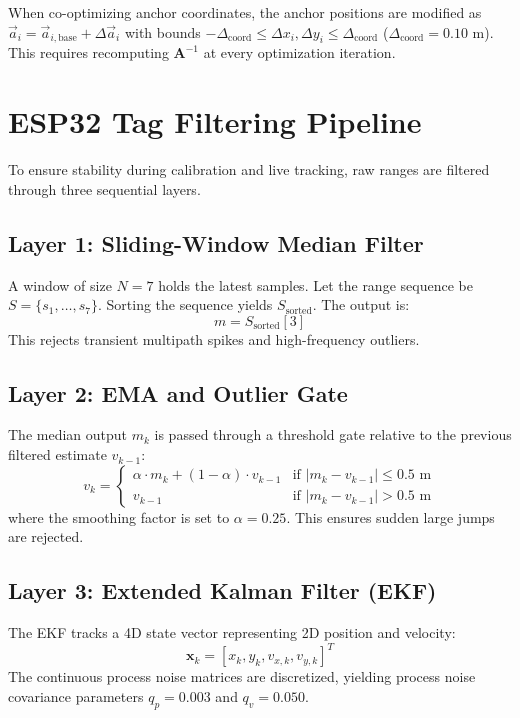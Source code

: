 \documentclass[11pt,a4paper]{article}
\begin{document}
When co-optimizing anchor coordinates, the anchor positions are modified as $\vec{a}_i = \vec{a}_{i,\text{base}} + \Delta\vec{a}_i$ with bounds $-\Delta_{\text{coord}} \le \Delta x_i, \Delta y_i \le \Delta_{\text{coord}}$ ($\Delta_{\text{coord}} = 0.10 \text{ m}$). This requires recomputing $\mathbf{A}^{-1}$ at every optimization iteration.

\newpage
\section{ESP32 Tag Filtering Pipeline}
To ensure stability during calibration and live tracking, raw ranges are filtered through three sequential layers.

\subsection{Layer 1: Sliding-Window Median Filter}
A window of size $N=7$ holds the latest samples. Let the range sequence be $S = \{s_1, \dots, s_7\}$. Sorting the sequence yields $S_{\text{sorted}}$. The output is:
\begin{equation}
    m = S_{\text{sorted}}[3]
\end{equation}
This rejects transient multipath spikes and high-frequency outliers.

\subsection{Layer 2: EMA and Outlier Gate}
The median output $m_k$ is passed through a threshold gate relative to the previous filtered estimate $v_{k-1}$:
\begin{equation}
    v_k = 
    \begin{cases} 
      \alpha \cdot m_k + (1-\alpha) \cdot v_{k-1} & \text{if } |m_k - v_{k-1}| \le 0.5 \text{ m} \\
      v_{k-1} & \text{if } |m_k - v_{k-1}| > 0.5 \text{ m}
   \end{cases}
\end{equation}
where the smoothing factor is set to $\alpha = 0.25$. This ensures sudden large jumps are rejected.

\subsection{Layer 3: Extended Kalman Filter (EKF)}
The EKF tracks a 4D state vector representing 2D position and velocity:
\begin{equation}
    \mathbf{x}_k = [x_k, y_k, v_{x,k}, v_{y,k}]^T
\end{equation}
The continuous process noise matrices are discretized, yielding process noise covariance parameters $q_p = 0.003$ and $q_v = 0.050$.
\end{document}
